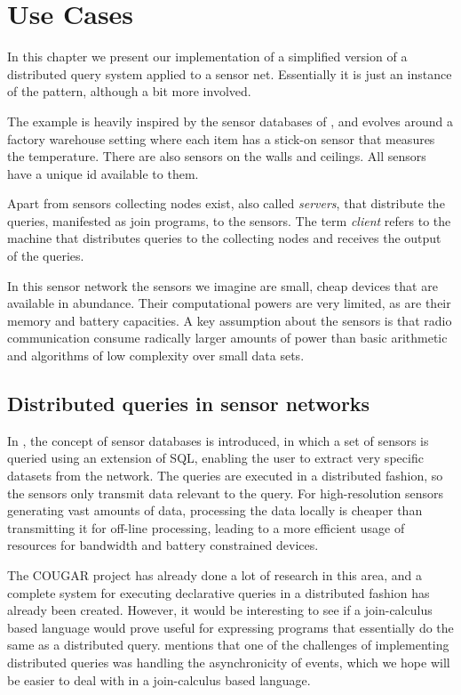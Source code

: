 
\section{Use Cases}

In this chapter we present our implementation of a simplified version of a
distributed query system applied to a sensor net. Essentially it is just an
instance of the  pattern, although a bit more involved.

The example is heavily inspired by the sensor databases of
\cite{bonnet2001towards}, and evolves around a factory warehouse setting where
each item has a stick-on sensor that measures the temperature. There are also
sensors on the walls and ceilings. All sensors have a unique id available to
them.

Apart from sensors collecting nodes exist, also called \emph{servers}, that
distribute the queries, manifested as join programs, to the sensors. The term
\emph{client} refers to the machine that distributes queries to the collecting
nodes and receives the output of the queries.

In this sensor network the sensors we imagine are small, cheap devices that are
available in abundance. Their computational powers are very limited, as are
their memory and battery capacities. A key assumption about the sensors is that
radio communication consume radically larger amounts of power than basic
arithmetic and algorithms of low complexity over small data sets.

\subsection*{Distributed queries in sensor networks}

In \cite{bonnet2001towards}, the concept of sensor databases is introduced, in
which a set of sensors is queried using an extension of SQL, enabling the user
to extract very specific datasets from the network. The queries are executed in
a distributed fashion, so the sensors only transmit data relevant to the query.
For high-resolution sensors generating vast amounts of data, processing the
data locally is cheaper than transmitting it for off-line processing, leading
to a more efficient usage of resources for bandwidth and battery constrained
devices.

The COUGAR project\cite{COUGAR} has already done a lot of research in this
area, and a complete system for executing declarative queries in a distributed
fashion has already been created. However, it would be interesting to see if a
join-calculus based language would prove useful for expressing programs that
essentially do the same as a distributed query. \cite{bonnet2001towards}
mentions that one of the challenges of implementing distributed queries was
handling the asynchronicity of events, which we hope will be easier to deal
with in a join-calculus based language.

